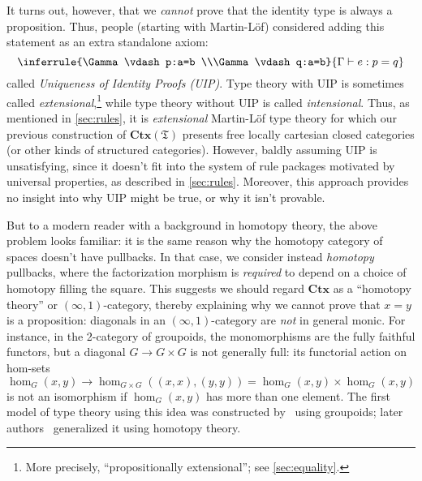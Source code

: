 \documentclass[12pt]{article}
\def\oo{\ensuremath{\infty}}
\def\io{\ensuremath{(\oo,1)}}
\def\ty{\;\mathsf{type}}
\def\types{\vdash}
\def\Ctx{\mathbf{Ctx}}
\def\fT{\mathfrak{T}}
\def\CtxT{\mathbf{Ctx}(\fT)}
\numberwithin{equation}{section}
\begin{document}
It turns out, however, that we \emph{cannot} prove that the identity type is always a proposition.
Thus, people (starting with Martin-L\"{o}f) considered adding this statement as an extra standalone axiom:
\begin{equation}
  \inferrule{%
    \Gamma\types p:a=b \\\Gamma\types q:a=b}{\Gamma\types e:p=q}\label{eq:uip}
\end{equation}
called \emph{Uniqueness of Identity Proofs (UIP)}.
Type theory with UIP is sometimes called \emph{extensional},\footnote{More precisely, ``propositionally extensional''; see \cref{sec:equality}.} while type theory without UIP is called \emph{intensional}.
Thus, as mentioned in \cref{sec:rules}, it is \emph{extensional} Martin-L\"{o}f type theory for which our previous construction of $\CtxT$ presents free locally cartesian closed categories (or other kinds of structured categories).
%
However, baldly assuming UIP is unsatisfying, since it doesn't fit into the system of rule packages motivated by universal properties, as described in \cref{sec:rules}.
Moreover, this approach provides no insight into why UIP might be true, or why it isn't provable.

But to a modern reader with a background in homotopy theory, the above problem looks familiar: it is the same reason why the homotopy category of spaces doesn't have pullbacks.
In that case, we consider instead \emph{homotopy} pullbacks, where the factorization morphism is \emph{required} to depend on a choice of homotopy filling the square.
This suggests we should regard $\Ctx$ as a ``homotopy theory'' or $\io$-category, thereby explaining why we cannot prove that $x=y$ is a proposition: diagonals in an $\io$-category are \emph{not} in general monic.
For instance, in the 2-category of groupoids, the monomorphisms are the fully faithful functors, but a diagonal $G\to G\times G$ is not generally full: its functorial action on hom-sets
\[\hom_G(x,y) \longrightarrow \hom_{G\times G}((x,x),(y,y)) = \hom_G(x,y) \times \hom_G(x,y)\]
is not an isomorphism if $\hom_G(x,y)$ has more than one element.
The first model of type theory using this idea was constructed by~\cite{hs:gpd-typethy} using groupoids; later authors~\cite{aw:htpy-idtype,klv:ssetmodel} generalized it using homotopy theory.
\end{document}
